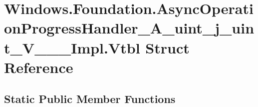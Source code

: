 \hypertarget{struct_windows_1_1_foundation_1_1_async_operation_progress_handler___a__uint__j__uint___v_______impl_1_1_vtbl}{}\section{Windows.\+Foundation.\+Async\+Operation\+Progress\+Handler\+\_\+\+A\+\_\+uint\+\_\+j\+\_\+uint\+\_\+\+V\+\_\+\+\_\+\+\_\+\+Impl.\+Vtbl Struct Reference}
\label{struct_windows_1_1_foundation_1_1_async_operation_progress_handler___a__uint__j__uint___v_______impl_1_1_vtbl}
\subsection*{Static Public Member Functions}
